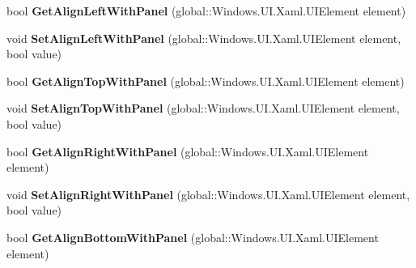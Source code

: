 \begin{DoxyCompactItemize}
bool {\bfseries Get\+Align\+Left\+With\+Panel} (global\+::\+Windows.\+U\+I.\+Xaml.\+U\+I\+Element element)
\item 
\mbox{\label{interface_windows_1_1_u_i_1_1_xaml_1_1_controls_1_1_i_relative_panel_statics_ad6312a801d02ea8acb68387074ecb007}} 
void {\bfseries Set\+Align\+Left\+With\+Panel} (global\+::\+Windows.\+U\+I.\+Xaml.\+U\+I\+Element element, bool value)
\item 
\mbox{\label{interface_windows_1_1_u_i_1_1_xaml_1_1_controls_1_1_i_relative_panel_statics_a190b602dadc7feff901b6c1ab1906898}} 
bool {\bfseries Get\+Align\+Top\+With\+Panel} (global\+::\+Windows.\+U\+I.\+Xaml.\+U\+I\+Element element)
\item 
\mbox{\label{interface_windows_1_1_u_i_1_1_xaml_1_1_controls_1_1_i_relative_panel_statics_a7980252289e1bd42485241913f9afdad}} 
void {\bfseries Set\+Align\+Top\+With\+Panel} (global\+::\+Windows.\+U\+I.\+Xaml.\+U\+I\+Element element, bool value)
\item 
\mbox{\label{interface_windows_1_1_u_i_1_1_xaml_1_1_controls_1_1_i_relative_panel_statics_a61fabd1c8713c07b5ac48fa9a27f4ae5}} 
bool {\bfseries Get\+Align\+Right\+With\+Panel} (global\+::\+Windows.\+U\+I.\+Xaml.\+U\+I\+Element element)
\item 
\mbox{\label{interface_windows_1_1_u_i_1_1_xaml_1_1_controls_1_1_i_relative_panel_statics_a2c4edfaf4e3bacc3f959ee0a58907e8a}} 
void {\bfseries Set\+Align\+Right\+With\+Panel} (global\+::\+Windows.\+U\+I.\+Xaml.\+U\+I\+Element element, bool value)
\item 
\mbox{\label{interface_windows_1_1_u_i_1_1_xaml_1_1_controls_1_1_i_relative_panel_statics_ae0d4717061b42365289442969aba8977}} 
bool {\bfseries Get\+Align\+Bottom\+With\+Panel} (global\+::\+Windows.\+U\+I.\+Xaml.\+U\+I\+Element element)
\item 

\end{DoxyCompactItemize}
